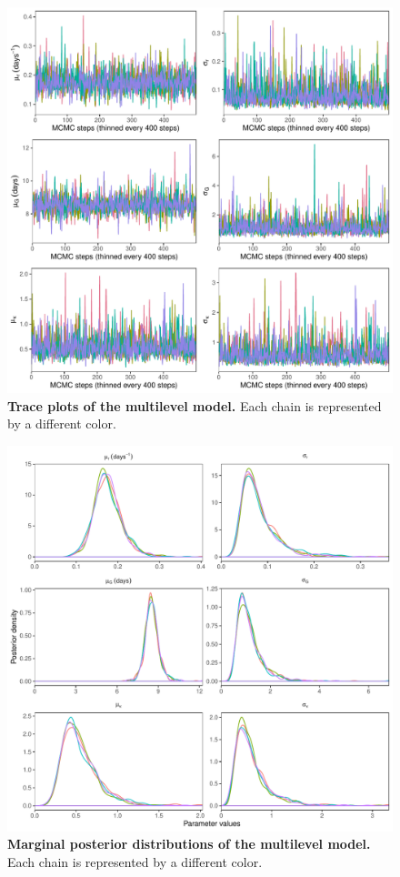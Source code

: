 \documentclass[12pt]{article}
\begin{document}
\begin{figure}[!h]
\includegraphics[width=\textwidth]{posterior_chain.pdf}
\caption{
\textbf{Trace plots of the multilevel model.}
Each chain is represented by a different color.
}
\end{figure}

\pagebreak

\begin{figure}[!h]
\includegraphics[width=\textwidth]{posterior_dist.pdf}
\caption{
\textbf{Marginal posterior distributions of the multilevel model.}
Each chain is represented by a different color.
}
\end{figure}
\end{document}
